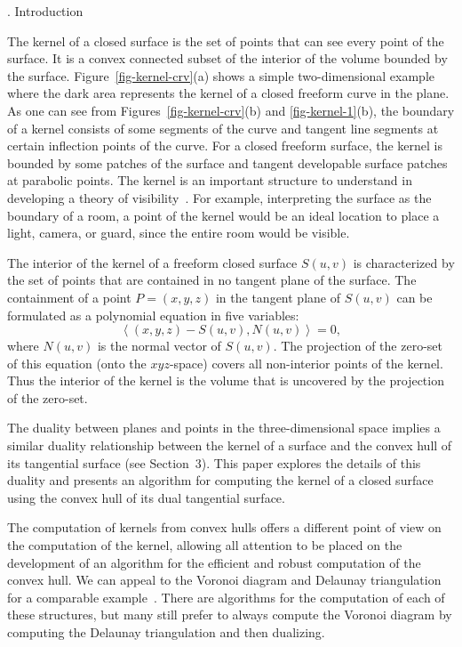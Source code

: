 \documentclass[twoside]{article}
\newcommand{\inner}[2]{\left<{#1}, {#2} \right>}
\newcounter{sectionc}\newcounter{subsectionc}\newcounter{subsubsectionc}
\renewcommand{\section}[1] {\vspace{12pt}\addtocounter{sectionc}{1} 
\setcounter{subsectionc}{0}\setcounter{subsubsectionc}{0}\noindent 
	{\tenbf\thesectionc. #1}\par\vspace{5pt}}
\newcommand{\textlineskip}{\baselineskip=13pt}
\begin{document}
\bigskip

\vspace*{1pt}\textlineskip	%
\section{Introduction}	%
\vspace*{-0.5pt}
\noindent
\label{sec-introduction}

The kernel of a closed surface is the set of points
that can see every point of the surface.
It is a convex connected subset of the interior of the volume
bounded by the surface.
Figure~\ref{fig-kernel-crv}(a) shows a simple two-dimensional example
where the dark area represents the kernel of a closed freeform curve
in the plane.  As one can see from Figures~\ref{fig-kernel-crv}(b) and 
\ref{fig-kernel-1}(b), the boundary of 
a kernel consists of some segments of the curve and tangent line segments
at certain inflection points of the curve.
For a closed freeform surface, the kernel is bounded by some patches
of the surface and tangent developable surface patches at parabolic points.
The kernel is an important structure to understand in developing
a theory of visibility~\cite{1}.  For example, interpreting the surface 
as the boundary of a room, a point of the kernel would be an ideal
location to place a light, camera, or guard,
since the entire room would be visible.

The interior of the kernel of a freeform closed surface $S(u,v)$
is characterized by the set of points that are contained
in no tangent plane of the surface.  The containment of
a point $P = (x,y,z)$ in the tangent plane of $S(u,v)$ can be
formulated as a polynomial equation in five variables:
\[
\inner{(x,y,z)-S(u,v)}{N(u,v)} = 0,
\]
where $N(u,v)$ is the normal vector of $S(u,v)$.
The projection of the zero-set of this equation
(onto the $xyz$-space) covers all non-interior points of the kernel.
Thus the interior of the kernel is the volume
that is uncovered by the projection of the zero-set.

The duality between planes and points in the three-dimensional space
implies a similar duality relationship between the kernel of a surface and
the convex hull of its tangential surface (see Section~3).  
This paper explores the details of this duality
and presents an algorithm for computing the kernel of a closed surface
using the convex hull of its dual tangential surface.

The computation of kernels from convex hulls offers a different point of
view on the computation of the kernel, allowing all attention
to be placed on the development of an algorithm
for the efficient and robust computation of the convex hull.
We can appeal to the Voronoi diagram and Delaunay triangulation
for a comparable example~\cite{1}.  There are algorithms for the computation of
each of these structures, but many still prefer to always compute
the Voronoi diagram by computing the Delaunay triangulation and then dualizing.
\end{document}
